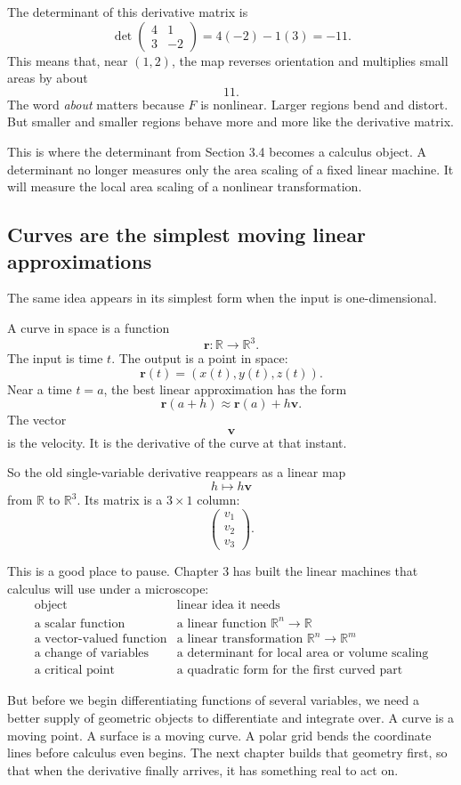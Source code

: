 The determinant of this derivative matrix is
\[
    \det
    \begin{pmatrix}
        4&1\\
        3&-2
    \end{pmatrix}
    =
    4(-2)-1(3)
    =
    -11.
\]
This means that, near \((1,2)\), the map reverses orientation and multiplies small areas
by about
\[
    11.
\]
The word \emph{about} matters because \(F\) is nonlinear.  Larger regions bend and
distort.  But smaller and smaller regions behave more and more like the derivative
matrix.

This is where the determinant from Section 3.4 becomes a calculus object.  A
determinant no longer measures only the area scaling of a fixed linear machine.  It will
measure the local area scaling of a nonlinear transformation.

\subsection{Curves are the simplest moving linear approximations}

The same idea appears in its simplest form when the input is one-dimensional.

A curve in space is a function
\[
    \mathbf r:\mathbb R\to\mathbb R^3.
\]
The input is time \(t\).  The output is a point in space:
\[
    \mathbf r(t)=(x(t),y(t),z(t)).
\]
Near a time \(t=a\), the best linear approximation has the form
\[
    \mathbf r(a+h)\approx \mathbf r(a)+h\mathbf v.
\]
The vector
\[
    \mathbf v
\]
is the velocity.  It is the derivative of the curve at that instant.

So the old single-variable derivative reappears as a linear map
\[
    h\longmapsto h\mathbf v
\]
from \(\mathbb R\) to \(\mathbb R^3\).  Its matrix is a \(3\times1\) column:
\[
    \begin{pmatrix}
        v_1\\
        v_2\\
        v_3
    \end{pmatrix}.
\]

This is a good place to pause.  Chapter 3 has built the linear machines that calculus
will use under a microscope:
\[
\begin{array}{c|c}
\text{object} & \text{linear idea it needs} \\ \hline
\text{a scalar function} & \text{a linear function } \mathbb R^n\to\mathbb R\\
\text{a vector-valued function} & \text{a linear transformation } \mathbb R^n\to\mathbb R^m\\
\text{a change of variables} & \text{a determinant for local area or volume scaling}\\
\text{a critical point} & \text{a quadratic form for the first curved part}
\end{array}
\]

But before we begin differentiating functions of several variables, we need a better
supply of geometric objects to differentiate and integrate over.  A curve is a moving
point.  A surface is a moving curve.  A polar grid bends the coordinate lines before
calculus even begins.  The next chapter builds that geometry first, so that when the
derivative finally arrives, it has something real to act on.
